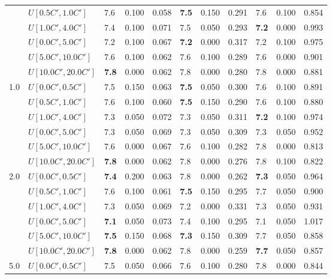 \begin{table}[h]
{\begin{tabular}{|l|l||l|l|l||l|l|l||l|l|l|}
       & $U[0.5C',1.0C']$ & 7.6 & 0.100 & 0.058 & \textbf{7.5} & 0.150 & 0.291 & 7.6 & 0.100 & 0.854 \\
       & $U[1.0C',4.0C']$ & 7.4 & 0.100 & 0.071 & 7.5 & 0.050 & 0.293 & \textbf{7.2} & 0.000 & 0.993 \\
       & $U[0.0C',5.0C']$ & 7.2 & 0.100 & 0.067 & \textbf{7.2} & 0.000 & 0.317 & 7.2 & 0.100 & 0.975 \\
       & $U[5.0C',10.0C']$ & 7.6 & 0.100 & 0.062 & 7.6 & 0.100 & 0.289 & 7.6 & 0.000 & 0.901 \\
       & $U[10.0C',20.0C']$ & \textbf{7.8} & 0.000 & 0.062 & 7.8 & 0.000 & 0.280 & 7.8 & 0.000 & 0.881 \\
      \hline\hline
      \multirow{6}{*}{1.0} & $U[0.0C',0.5C']$ & 7.5 & 0.150 & 0.063 & \textbf{7.5} & 0.050 & 0.300 & 7.6 & 0.100 & 0.891 \\
       & $U[0.5C',1.0C']$ & 7.6 & 0.100 & 0.060 & \textbf{7.5} & 0.150 & 0.290 & 7.6 & 0.100 & 0.880 \\
       & $U[1.0C',4.0C']$ & 7.3 & 0.050 & 0.072 & 7.3 & 0.050 & 0.311 & \textbf{7.2} & 0.100 & 0.974 \\
       & $U[0.0C',5.0C']$ & 7.3 & 0.050 & 0.069 & 7.3 & 0.050 & 0.309 & 7.3 & 0.050 & 0.952 \\
       & $U[5.0C',10.0C']$ & 7.6 & 0.000 & 0.067 & 7.6 & 0.100 & 0.282 & 7.8 & 0.000 & 0.813 \\
       & $U[10.0C',20.0C']$ & \textbf{7.8} & 0.000 & 0.062 & 7.8 & 0.000 & 0.276 & 7.8 & 0.100 & 0.822 \\
      \hline\hline
      \multirow{6}{*}{2.0} & $U[0.0C',0.5C']$ & \textbf{7.4} & 0.200 & 0.063 & 7.8 & 0.000 & 0.262 & \textbf{7.3} & 0.050 & 0.964 \\
       & $U[0.5C',1.0C']$ & 7.6 & 0.100 & 0.061 & \textbf{7.5} & 0.150 & 0.295 & 7.7 & 0.050 & 0.900 \\
       & $U[1.0C',4.0C']$ & 7.3 & 0.050 & 0.069 & 7.2 & 0.000 & 0.331 & 7.3 & 0.050 & 0.931 \\
       & $U[0.0C',5.0C']$ & \textbf{7.1} & 0.050 & 0.073 & 7.4 & 0.100 & 0.295 & 7.1 & 0.050 & 1.017 \\
       & $U[5.0C',10.0C']$ & \textbf{7.5} & 0.150 & 0.068 & \textbf{7.3} & 0.150 & 0.309 & 7.7 & 0.050 & 0.858 \\
       & $U[10.0C',20.0C']$ & \textbf{7.8} & 0.000 & 0.062 & 7.8 & 0.000 & 0.259 & \textbf{7.7} & 0.050 & 0.857 \\
      \hline\hline
      \multirow{6}{*}{5.0} & $U[0.0C',0.5C']$ & 7.5 & 0.050 & 0.066 & 7.6 & 0.100 & 0.280 & 7.8 & 0.000 & 0.844 \\

\end{tabular}}
\end{table}

